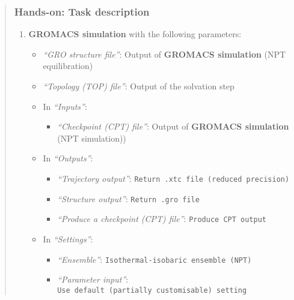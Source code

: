 \documentclass[twocolumn]{bmcart}%
\providecommand{\tightlist}{%
  \setlength{\itemsep}{0pt}\setlength{\parskip}{0pt}}
\providecommand{\tightlist}{%
  \setlength{\itemsep}{0pt}\setlength{\parskip}{0pt}}
\begin{document}
\begin{quote}
\hypertarget{hands-on-task-description-6}{%
\subsubsection{Hands-on: Task
description}\label{hands-on-task-description-6}}

\begin{enumerate}
\def\labelenumi{\arabic{enumi}.}
\tightlist
\item
  \textbf{GROMACS simulation} with the following parameters:

  \begin{itemize}
  \tightlist
  \item
    \emph{``GRO structure file''}: Output of \textbf{GROMACS simulation}
    (NPT equilibration)
  \item
    \emph{``Topology (TOP) file''}: Output of the solvation step
  \item
    In \emph{``Inputs''}:

    \begin{itemize}
    \tightlist
    \item
      \emph{``Checkpoint (CPT) file''}: Output of \textbf{GROMACS
      simulation} (NPT simulation))
    \end{itemize}
  \item
    In \emph{``Outputs''}:

    \begin{itemize}
    \tightlist
    \item
      \emph{``Trajectory output''}:
      \texttt{Return\ .xtc\ file\ (reduced\ precision)}
    \item
      \emph{``Structure output''}: \texttt{Return\ .gro\ file}
    \item
      \emph{``Produce a checkpoint (CPT) file''}:
      \texttt{Produce\ CPT\ output}
    \end{itemize}
  \item
    In \emph{``Settings''}:

    \begin{itemize}
    \tightlist
    \item
      \emph{``Ensemble''}: \texttt{Isothermal-isobaric\ ensemble\ (NPT)}
    \item
      \emph{``Parameter input''}:
      \texttt{Use\ default\ (partially\ customisable)\ setting}


\end{itemize}
\end{itemize}
\end{enumerate}
\end{quote}
\end{document}
